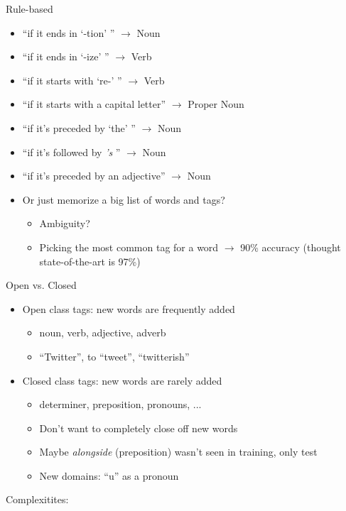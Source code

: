 \documentclass[11pt,letterpaper]{article}
\begin{document}
Rule-based

\begin{itemize}
  \item ``if it ends in `-tion' '' $\rightarrow$ Noun
  \item ``if it ends in `-ize' '' $\rightarrow$ Verb
  \item ``if it starts with `re-' '' $\rightarrow$ Verb
  \item ``if it starts with a capital letter'' $\rightarrow$ Proper Noun
  \item ``if it's preceded by `the' '' $\rightarrow$ Noun
  \item ``if it's followed by \textit{'s} '' $\rightarrow$ Noun
  \item ``if it's preceded by an adjective'' $\rightarrow$ Noun
  \item Or just memorize a big list of words and tags?
    \begin{itemize}
      \item Ambiguity?
      \item Picking the most common tag for a word $\rightarrow$ 90\% accuracy (thought state-of-the-art is 97\%)
    \end{itemize}
\end{itemize}

Open vs. Closed

\begin{itemize}
  \item Open class tags: new words are frequently added
    \begin{itemize}
      \item noun, verb, adjective, adverb
      \item ``Twitter'', to ``tweet'', ``twitterish''
    \end{itemize}
  \item Closed class tags: new words are rarely added
    \begin{itemize}
      \item determiner, preposition, pronouns, ...
      \item Don't want to completely close off new words
      \item Maybe \textit{alongside} (preposition) wasn't seen in training, only test
      \item New domains: ``u'' as a pronoun
    \end{itemize}
\end{itemize}

Complexitites:
\end{document}
